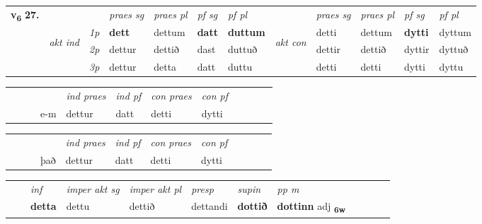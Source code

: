 \begin{tabular}{llllllllllll} \toprule
\multirow{4}{*}{{{\textbf{v{\textsubscript{6}}} \Large{\textbf{27.}}}}}  & &   &  \textit{praes sg}  & \textit{praes pl}  &\textit{ pf sg} & \textit{pf pl} &  &  \textit{praes sg}  & \textit{praes pl}  & \textit{pf sg} & \textit{pf pl } \\*
	\cmidrule{4-7} \cmidrule{9-12}
 & \multirow{3}{*}{\begin{turn}{90}\textit{akt ind}\end{turn}} & {\textit{1p}} & \textbf{dett} & dettum    & \textbf{datt} & \textbf{duttum} & \multirow{3}{*}{\begin{turn}{90}\textit{akt con}\end{turn}} &detti & dettum & \textbf{dytti} & dyttum\\*
& &  {\textit{2p}} &  dettur  & dettið   & dast & duttuð & & dettir & dettið & dyttir & dyttuð \\*
& &  {\textit{3p}} & dettur & detta   & datt & duttu & & detti & detti& dytti & dyttu  \\*
\cmidrule{4-7} \cmidrule{9-12}
\end{tabular}


\begin{tabular}{llllllllllll}
 & &  & &  \textit{ind praes} & \textit{ind pf} & \textit{con praes} & \textit{con pf} \\*
&  & & e-m & dettur & datt & detti & dytti \\*
\cmidrule{5-9}
\end{tabular}


\begin{tabular}{llllllllllll}
 & &  & &  \textit{ind praes} & \textit{ind pf} & \textit{con praes} & \textit{con pf} \\*
&  & & það & dettur & datt & detti & dytti \\*
\cmidrule{5-9}
\end{tabular}


\begin{tabular}{llllllllllll}
 & & \textit{inf} & \textit{imper akt sg} & \textit{imper akt pl}   & \textit{presp} & \textit{supin}  & \textit{pp m}     \\*
  & & \textbf{detta} & dettu  & dettið   & dettandi &  \textbf{dottið}  & \textbf{dottinn} adj \textbf{\textsubscript{6w}} \\*
\cmidrule{1-12}
\end{tabular}



